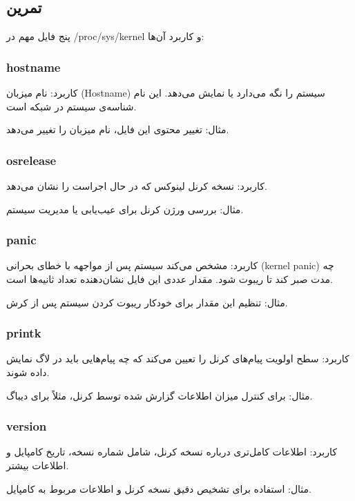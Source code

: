 \documentclass[12pt]{article}
\begin{document}
	\subsection{تمرین}
	پنج فایل مهم در /proc/sys/kernel و کاربرد آن‌ها:
	
	\subsubsection*{hostname}
	
	کاربرد: نام میزبان (Hostname) سیستم را نگه می‌دارد یا نمایش می‌دهد. این نام شناسه‌ی سیستم در شبکه است.
	
	مثال: تغییر محتوی این فایل، نام میزبان را تغییر می‌دهد.
	
	\subsubsection*{osrelease}
	
	کاربرد: نسخه کرنل لینوکس که در حال اجراست را نشان می‌دهد.
	
	مثال: بررسی ورژن کرنل برای عیب‌یابی یا مدیریت سیستم.
	
	\subsubsection*{panic}
	
	کاربرد: مشخص می‌کند سیستم پس از مواجهه با خطای بحرانی \textenglish{(kernel panic)} چه مدت صبر کند تا ریبوت شود. مقدار عددی این فایل نشان‌دهنده تعداد ثانیه‌ها است.
	
	مثال: تنظیم این مقدار برای خودکار ریبوت کردن سیستم پس از کرش.
	
	\subsubsection*{printk}
	
	کاربرد: سطح اولویت پیام‌های کرنل را تعیین می‌کند که چه پیام‌هایی باید در لاگ نمایش داده شوند.
	
	مثال: برای کنترل میزان اطلاعات گزارش شده توسط کرنل، مثلاً برای دیباگ.
	
	\subsubsection*{version}
	
	کاربرد: اطلاعات کامل‌تری درباره نسخه کرنل، شامل شماره نسخه، تاریخ کامپایل و اطلاعات بیشتر.
	
	مثال: استفاده برای تشخیص دقیق نسخه کرنل و اطلاعات مربوط به کامپایل.
	
\end{document}
